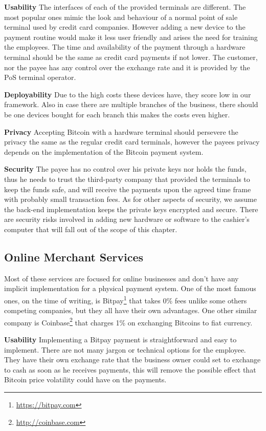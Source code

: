 \textbf{Usability}
The interfaces of each of the provided terminals are different. The most popular ones mimic the look and behaviour of a normal point of sale terminal used by credit card companies. However adding a new device to the payment routine would make it less user friendly and arises the need for training the employees. The time and availability of the payment through a hardware terminal should be the same as credit card payments if not lower. The customer, nor the payee has any control over the exchange rate and it is provided by the PoS terminal operator.

\textbf{Deployability}
Due to the high costs these devices have, they score low in our framework. Also in case there are multiple branches of the business, there should be one devices bought for each branch this makes the costs even higher.

\textbf{Privacy}
Accepting Bitcoin with a hardware terminal should persevere the privacy the same as the regular credit card terminals, however the payees privacy depends on the implementation of the Bitcoin payment system. 

\textbf{Security}
The payee has no control over his private keys nor holds the funds, thus he needs to trust the third-party company that provided the terminals to keep the funds safe, and will receive the payments upon the agreed time frame with probably small transaction fees. As for other aspects of security, we assume the back-end implementation keeps the private keys encrypted and secure. There are security risks involved in adding new hardware or software to the cashier's computer that will fall out of the scope of this chapter.

\subsection{Online Merchant Services}
Most of these services are focused for online businesses and don't have any implicit implementation for a physical payment system. 
One of the most famous ones, on the time of writing, is Bitpay\footnote{\url{https://bitpay.com}} that takes 0\% fees unlike some others competing companies, but they all have their own advantages. One other similar company is Coinbase\footnote{\url{http://coinbase.com}} that charges 1\% on exchanging Bitcoins to fiat currency.

 \textbf{Usability}
Implementing a Bitpay payment is straightforward and easy to implement. There are not many jargon or technical options for the employee. They have their own exchange rate that the business owner could set to exchange to cash as soon as he receives payments, this will remove the possible effect that Bitcoin price volatility could have on the payments.

